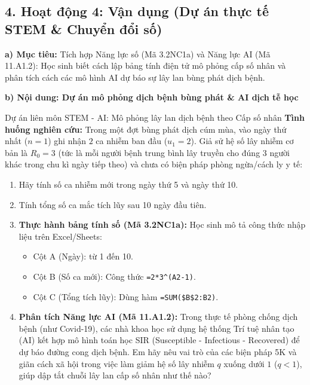 \documentclass[12pt, a4paper]{article}
\begin{document}
\subsection*{4. Hoạt động 4: Vận dụng (Dự án thực tế STEM \& Chuyển đổi số)}

\noindent \textbf{a) Mục tiêu:}
Tích hợp Năng lực số (Mã 3.2NC1a) và Năng lực AI (Mã 11.A1.2): Học sinh biết cách lập bảng tính điện tử mô phỏng cấp số nhân và phân tích cách các mô hình AI dự báo sự lây lan bùng phát dịch bệnh.

\noindent \textbf{b) Nội dung: Dự án mô phỏng dịch bệnh bùng phát \& AI dịch tễ học}
\begin{aibox}{Dự án liên môn STEM - AI: Mô phỏng lây lan dịch bệnh theo Cấp số nhân}
\textbf{Tình huống nghiên cứu:}
Trong một đợt bùng phát dịch cúm mùa, vào ngày thứ nhất ($n = 1$) ghi nhận $2$ ca nhiễm ban đầu ($u_1 = 2$). Giả sử hệ số lây nhiễm cơ bản là $R_0 = 3$ (tức là mỗi người bệnh trung bình lây truyền cho đúng 3 người khác trong chu kì ngày tiếp theo) và chưa có biện pháp phòng ngừa/cách ly y tế:
\begin{enumerate}[leftmargin=0.6cm]
    \item Hãy tính số ca nhiễm mới trong ngày thứ 5 và ngày thứ 10.
    \item Tính tổng số ca mắc tích lũy sau 10 ngày đầu tiên.
    \item \textbf{Thực hành bảng tính số (Mã 3.2NC1a):} Học sinh mô tả công thức nhập liệu trên Excel/Sheets:
    \begin{itemize}
        \item Cột A (Ngày): từ 1 đến 10.
        \item Cột B (Số ca mới): Công thức \texttt{=2*3\^{}(A2-1)}.
        \item Cột C (Tổng tích lũy): Dùng hàm \texttt{=SUM(\$B\$2:B2)}.
    \end{itemize}
    \item \textbf{Phân tích Năng lực AI (Mã 11.A1.2):} Trong thực tế phòng chống dịch bệnh (như Covid-19), các nhà khoa học sử dụng hệ thống Trí tuệ nhân tạo (AI) kết hợp mô hình toán học SIR (Susceptible - Infectious - Recovered) để dự báo đường cong dịch bệnh. Em hãy nêu vai trò của các biện pháp 5K và giãn cách xã hội trong việc làm giảm hệ số lây nhiễm $q$ xuống dưới $1$ ($q < 1$), giúp dập tắt chuỗi lây lan cấp số nhân như thế nào?
\end{enumerate}
\end{aibox}
\end{document}
